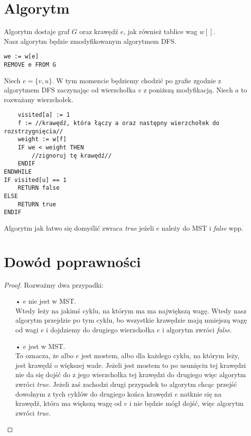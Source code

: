 \documentclass[11pt,wide]{mwart}
\begin{document}
\section{Algorytm}
Algorytm dostaje graf $G$ oraz krawędź $e$, jak również tablice wag $w[]$. \\
Nasz algorytm będzie zmodyfikowanym algorytmem DFS.
\begin{verbatim}
we := w[e]
REMOVE e FROM G
\end{verbatim}
Niech $e = \{v, u\}$. W tym momencie będziemy chodzić po grafie zgodnie z algorytmem DFS zaczynając od wierzchołka $v$ z poniższą modyfikacją. Niech $a$ to rozważany wierzchołek.
\begin{verbatim}
    visited[a] := 1
    f := //krawędź, która łączy a oraz następny wierzchołek do rozstrzygnięcia//
    weight := w[f]
    IF we < weight THEN
        //zignoruj tę krawędź//
    ENDIF
ENDWHILE
IF visited[u] == 1
    RETURN false
ELSE
    RETURN true
ENDIF
\end{verbatim}

Algorytm jak łatwo się domyślić zwraca \textit{true} jeżeli $e$ należy do MST i \textit{false} wpp.

\section{Dowód poprawności}
\begin{proof}

Rozważmy dwa przypadki:
\begin{itemize}
\item[•] $e$ nie jest w MST.\\ Wtedy leży na jakimś cyklu, na którym ma ma największą wagę. Wtedy nasz algorytm przejdzie po tym cyklu, bo wszystkie krawędzie mają mniejszą wagę od wagi $e$ i dojdziemy do drugiego wierzchołka $e$ i algorytm zwróci \textit{false}.
\item[•] $e$ jest w MST.\\ To oznacza, że albo $e$ jest mostem, albo dla każdego cyklu, na którym leży, jest krawędź o większej wade. Jeżeli jest mostem to po usunięciu tej krawędzi nie da się dojść do z jego wierzchołka tej krawędzi do drugiego więc algorytm zwróci \textit{true}. Jeżeli zaś zachodzi drugi przypadek to algorytm chcąc przejść dowolnym z tych cyklów do drugiego końca krawędzi $e$ natknie się na krawędź, która ma większą wagę od $e$ i nie będzie mógł dojść, więc algorytm zwróci \textit{true}.
\end{itemize}
\end{proof}
\end{document}
